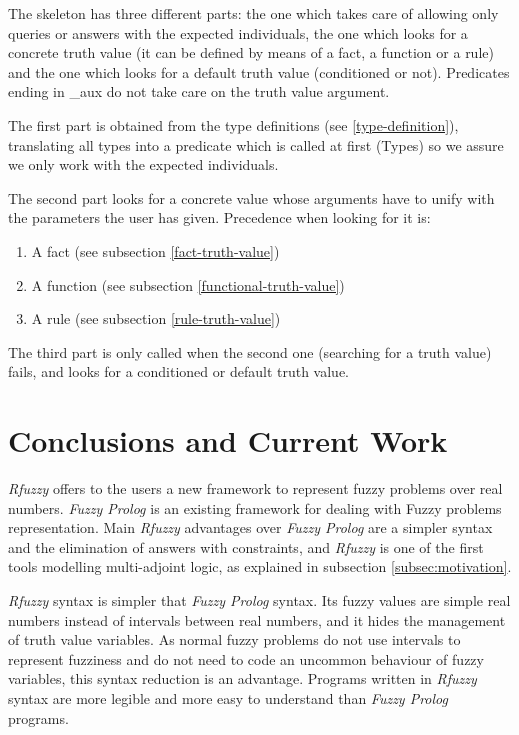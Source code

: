 \documentclass[runningheads,a4paper]{llncs}
\begin{document}
The skeleton has three different parts: the one which takes care of
allowing only queries or answers with the expected individuals, 
the one which looks for a concrete truth value (it can be defined
by means of a fact, a function or a rule) and the one which 
looks for a default truth value (conditioned or not).
Predicates ending in \_aux do not take care on the 
truth value argument. 

The first part is obtained from the type definitions (see \ref{type-definition}),
translating all types into a predicate which is called at 
first (Types) so we assure we only work with the expected 
individuals. 

The second part looks for a concrete value whose arguments have to unify 
with the parameters the user has given. 
Precedence when looking for it is: 
\begin{enumerate}
\item A fact (see subsection \ref{fact-truth-value})
\item A function (see subsection \ref{functional-truth-value})
\item A rule (see subsection \ref{rule-truth-value})
\end{enumerate}

The third part is only called when the second one (searching for a 
truth value) fails, and looks for a conditioned or default truth value.



\section{Conclusions and Current Work}

{\it Rfuzzy} offers to the users a new framework to represent 
fuzzy problems over real numbers. 
{\it Fuzzy Prolog} 
\cite{Vaucheret_ICLP02,Vaucheret_LPAR02,Susana_FSS04}
is an existing framework for dealing with Fuzzy problems
representation.  
Main {\it Rfuzzy} advantages over {\it Fuzzy Prolog} are 
a simpler syntax and the elimination of answers with constraints,
and {\it Rfuzzy} is one of the first tools modelling 
multi-adjoint logic, as explained in subsection 
\ref{subsec:motivation}.

{\it Rfuzzy} syntax is simpler that {\it Fuzzy Prolog} syntax.
Its fuzzy values are simple real numbers instead of 
intervals between real numbers, and it hides the
management of truth value variables.
As normal fuzzy problems do not use intervals to represent 
fuzziness and do not need to code an uncommon behaviour of 
fuzzy variables, this syntax reduction is an advantage. 
Programs written in {\it Rfuzzy} syntax are more legible
and more easy to understand than {\it Fuzzy Prolog} programs.
\end{document}
